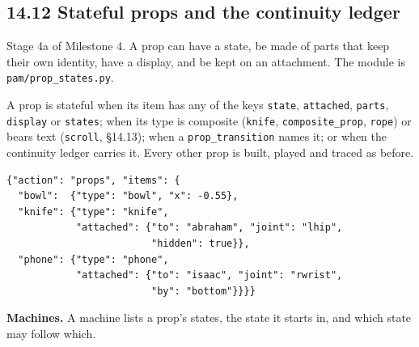 \documentclass[
  12pt,
  letterpaper,
]{book}
\begin{document}
\subsection{14.12 Stateful props and the continuity ledger}\label{stateful-props}

Stage 4a of Milestone 4. A prop can have a state, be made of parts
that keep their own identity, have a display, and be kept on an
attachment. The module is \texttt{pam/prop\_states.py}.

A prop is stateful when its item has any of the keys \texttt{state},
\texttt{attached}, \texttt{parts}, \texttt{display} or
\texttt{states}; when its type is composite (\texttt{knife},
\texttt{composite\_prop}, \texttt{rope}) or bears text
(\texttt{scroll}, \S14.13);
when a \texttt{prop\_transition} names it;
or when the continuity ledger carries it. Every other prop is built,
played and traced as before.

\begin{verbatim}
{"action": "props", "items": {
  "bowl":  {"type": "bowl", "x": -0.55},
  "knife": {"type": "knife",
            "attached": {"to": "abraham", "joint": "lhip",
                         "hidden": true}},
  "phone": {"type": "phone",
            "attached": {"to": "isaac", "joint": "rwrist",
                         "by": "bottom"}}}}
\end{verbatim}

\textbf{Machines.} A machine lists a prop's states, the state it
starts in, and which state may follow which.
\end{document}
